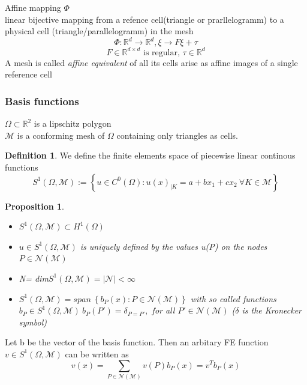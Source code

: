 \documentclass[english]{article}
\newtheorem*{prop}{Proposition}
\theoremstyle{definition}
\newtheorem*{defi}{Definition}
\theoremstyle{remark}
\newcommand{\M}{\mathcal{M}}
\newcommand{\N}{\mathcal{N}}
\newcommand{\RR}{\mathbb{R}}			%
\newcommand{\dd}{\delta}				%
\newcommand{\OO}{\Omega}
\newcommand{\tx}[1]{\text{#1}}
\begin{document}
Affine mapping $\Phi$\\
linear bijective mapping from a refence cell(triangle or prarllelogramm) to a physical cell (triangle/parallelogramm) in the mesh $$\Phi : \RR^d \to \RR^d , \xi \to F \xi + \tau$$
$$F \in \RR^{d\times d} \tx{ is regular, } \tau \in \RR^d$$
A mesh is called \emph{affine equivalent} of all its cells arise as affine images of a single reference cell
\subsubsection{Basis functions}
$\OO\subset \RR^2$ is a lipschitz polygon\\
$\M$ is a conforming mesh of $\OO$ containing only triangles as cells.
\begin{defi} We define  the finite elements space of piecewise linear continous functions
  $$S^1 (\OO,\M) := \left\{u \in C^0 (\OO) : u(x)_{|K} = a+bx_1+cx_2 \ \forall K \in \M\right\}$$
\end{defi}
\begin{prop}
  \begin{itemize}
  \item $S^1 (\OO,\M) \subset H^1(\OO)$
  \item $u \in S^1(\OO,\M) $ is uniquely defined by the values u(P) on the nodes $P \in \N(\M)$
  \item N= dim$ S^1(\OO,\M) = |\N | <\infty$
  \item $S^1(\OO,\M) = span\ \left\{b_P(x) : P\in \N(\M) \right\} $ with so called functions $b_P \in S^1(\OO,\M) \ b_P(P') = \dd_{P=P'}, $ for all $P'\in \N(\M)$ ($\dd$ is the Kronecker symbol)
  \end{itemize}
\end{prop}
Let b be the vector of the basis function. Then an arbitary FE function $v \in  S^1(\OO,\M)$ can be written as 
$$v(x) = \sum_{P \in \N(\M)} v(P) b_P(x) = v^T b_P(x)$$
\end{document}
